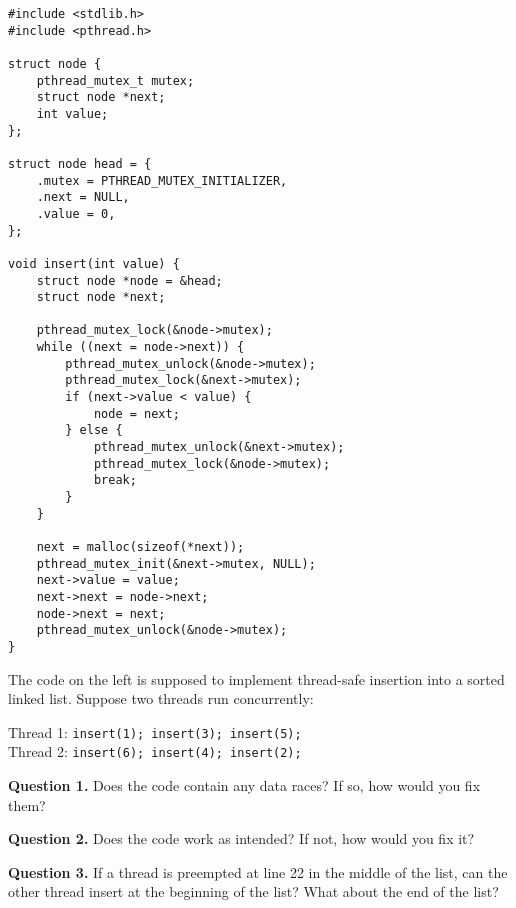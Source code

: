 \documentclass[letterpaper,twocolumn,10pt]{article}
\begin{document}
\begin{lstlisting}[style=CStyle]
#include <stdlib.h>
#include <pthread.h>

struct node {
    pthread_mutex_t mutex;
    struct node *next;
    int value;
};

struct node head = {
    .mutex = PTHREAD_MUTEX_INITIALIZER,
    .next = NULL,
    .value = 0,
};

void insert(int value) {
    struct node *node = &head;
    struct node *next;

    pthread_mutex_lock(&node->mutex);
    while ((next = node->next)) {
        pthread_mutex_unlock(&node->mutex);
        pthread_mutex_lock(&next->mutex);
        if (next->value < value) {
            node = next;
        } else {
            pthread_mutex_unlock(&next->mutex);
            pthread_mutex_lock(&node->mutex);
            break;
        }
    }

    next = malloc(sizeof(*next));
    pthread_mutex_init(&next->mutex, NULL);
    next->value = value;
    next->next = node->next;
    node->next = next;
    pthread_mutex_unlock(&node->mutex);
}
\end{lstlisting}

\break

\noindent
The code on the left is supposed to implement thread-safe insertion into a sorted linked list.
Suppose two threads run concurrently:

\vspace{1em}

\noindent
Thread 1: \texttt{insert(1); insert(3); insert(5);} \\
Thread 2: \texttt{insert(6); insert(4); insert(2);}

\vspace{2em}

\noindent
\textbf{Question 1.} Does the code contain any data races?  If so, how would you fix them?

\vspace{12em}

\noindent
\textbf{Question 2.} Does the code work as intended?  If not, how would you fix it?

\vspace{12em}

\noindent
\textbf{Question 3.} If a thread is preempted at line 22 in the middle of the list, can the other thread insert at the beginning of the list?  What about the end of the list?
\end{document}
